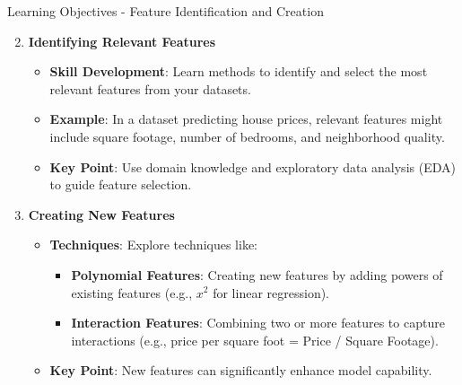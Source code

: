 \documentclass[aspectratio=169]{beamer}
\begin{document}
\begin{frame}[fragile]{Learning Objectives - Feature Identification and Creation}
    \begin{enumerate}
        \setcounter{enumi}{1}
        \item \textbf{Identifying Relevant Features}
            \begin{itemize}
                \item \textbf{Skill Development}: Learn methods to identify and select the most relevant features from your datasets.
                \item \textbf{Example}: In a dataset predicting house prices, relevant features might include square footage, number of bedrooms, and neighborhood quality.
                \item \textbf{Key Point}: Use domain knowledge and exploratory data analysis (EDA) to guide feature selection.
            \end{itemize}
        
        \item \textbf{Creating New Features}
            \begin{itemize}
                \item \textbf{Techniques}: Explore techniques like:
                \begin{itemize}
                    \item \textbf{Polynomial Features}: Creating new features by adding powers of existing features (e.g., $x^2$ for linear regression).
                    \item \textbf{Interaction Features}: Combining two or more features to capture interactions (e.g., price per square foot = Price / Square Footage).
                \end{itemize}
                \item \textbf{Key Point}: New features can significantly enhance model capability.
            \end{itemize}
    \end{enumerate}
\end{frame}
\end{document}
